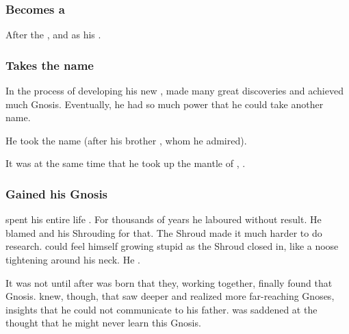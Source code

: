 \subsubsection{Becomes a \shaeeroth}
After the \Shrouding, \Secherdamon {} and  as his .





\subsubsection{Takes the name \Nexagglachel}
In the process of developing his new , \Secherdamon made many great discoveries and achieved much Gnosis.
Eventually, he had so much power that he could take another name. 

He took the name {\quo{\Nexagglachel}} (after his brother , whom he admired). 

It was at the same time that he took up the mantle of \quo{\RissitNechsain}, . 





\subsubsection{Gained his Gnosis}
\Secherdamon{} spent his entire life . 
For thousands of years he laboured without result. 
He blamed \Ishnaruchaefir{} and his Shrouding for that. 
The Shroud made it much harder to do research. 
\Secherdamon{} could feel himself growing stupid as the Shroud closed in, like a noose tightening around his neck. 
He . 

It was not until after  was born that they, working together, finally found that Gnosis. 
\Secherdamon{} knew, though, that \Vizsherioch{} saw deeper and realized more far-reaching Gnoses, insights that he could not communicate to his father. 
\Secherdamon{} was saddened at the thought that he might never learn this Gnosis. 





